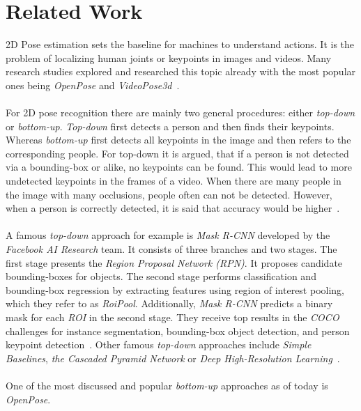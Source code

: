     \section{Related Work}

    2D Pose estimation sets the baseline for machines to understand actions.
    It is the problem of localizing human joints or keypoints in images and videos.
    Many research studies explored and researched this topic already with the most popular ones being \textit{OpenPose}
    and \textit{VideoPose3d}~\cite{openpose, videopose3d}.
\\\mbox{}\\
    For 2D pose recognition there are mainly two general procedures: either \textit{top-down} or \textit{bottom-up}.
    \textit{Top-down} first detects a person and then finds their keypoints.
    Whereas \textit{bottom-up} first detects all keypoints in the image and then refers to the corresponding people.
    For top-down it is argued, that if a person is not detected via a bounding-box or alike, no keypoints can be
    found.
    This would lead to more undetected keypoints in the frames of a video.
    When there are many people in the image with many occlusions, people often can not be detected.
    However, when a person is correctly detected, it is said that accuracy would be higher~\cite{synergetic}.
\\\mbox{}\\
    A famous \textit{top-down} approach for example is \textit{Mask R-CNN} developed by the \textit{Facebook AI Research} team. It consists
    of three branches and two stages.
    The first stage presents the \textit{Region Proposal Network (RPN)}. It proposes candidate bounding-boxes for objects.
    The second stage performs classification and bounding-box regression by extracting features using region of
    interest pooling, which they refer to as \textit{RoiPool}.
    Additionally, \textit{Mask R-CNN} predicts a binary mask for each \textit{ROI} in the second stage.
    They receive top results in the \textit{COCO} challenges for instance segmentation, bounding-box object detection, and
    person keypoint detection~\cite{maskrcnn}.
    Other famous \textit{top-down} approaches include \textit{Simple Baselines}, \textit{the Cascaded Pyramid Network} or
    \textit{Deep High-Resolution Learning}~\cite{simplebaselines,pyramidnetwork, highres}.
\\\mbox{}\\
    One of the most discussed and popular \textit{bottom-up} approaches as of today is \textit{OpenPose}.
